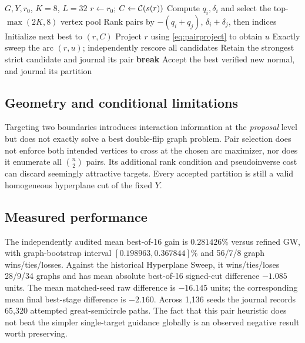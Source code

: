 \begin{algorithm}[tb]
\caption{Angular Pair Greedy}\label{alg:pair}
\begin{algorithmic}[1]
\Require $G,Y,r_0$, $K=8$, $L=32$
\State $r\gets r_0$; $C\gets\mathcal{C}(s(r))$
 \State Compute $q_i,\delta_i$ and select the top-$\max(2K,8)$ vertex pool
 \State Rank pairs by $-(q_i+q_j)$, $\delta_i+\delta_j$, then indices
 \State Initialize next best to $(r,C)$
  \State Project $r$ using \eqref{eq:pairproject} to obtain $u$
  \State Exactly sweep the arc $(r,u)$; independently rescore all candidates
  \State Retain the strongest strict candidate and journal its pair
 \EndFor
  \State \textbf{break}\EndIf
 \State Accept the best verified new normal, and journal its partition
\EndFor
\end{algorithmic}
\end{algorithm}

\subsection{Geometry and conditional limitations}
Targeting two boundaries introduces interaction information at the \emph{proposal} level but does not exactly solve a best double-flip graph problem. Pair selection does not enforce both intended vertices to cross at the chosen arc maximizer, nor does it enumerate all $\binom n2$ pairs. Its additional rank condition and pseudoinverse cost can discard seemingly attractive targets. Every accepted partition is still a valid homogeneous hyperplane cut of the fixed $Y$.

\subsection{Measured performance}
The independently audited mean best-of-16 gain is $0.281426\%$ versus refined GW, with graph-bootstrap interval $[0.198963,0.367844]\%$ and 56/7/8 graph wins/ties/losses. Against the historical Hyperplane Sweep, it wins/ties/loses 28/9/34 graphs and has mean absolute best-of-16 signed-cut difference $-1.085$ units. The mean matched-seed raw difference is $-16.145$ units; the corresponding mean final best-stage difference is $-2.160$. Across 1,136 seeds the journal records 65,320 attempted great-semicircle paths. The fact that this pair heuristic does not beat the simpler single-target guidance globally is an observed negative result worth preserving.
